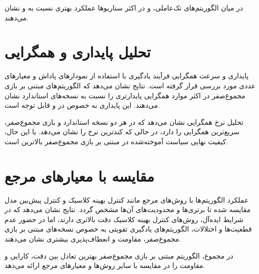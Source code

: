 در میان الگوریتم‌های تک‌عاملی،  و  در اکثر سناریوها عملکرد بهتری نسبت به  و  نشان می‌دهند.

\section{تحلیل پایداری و همگرایی}
\label{sec:stability_analysis}

پایداری و سرعت همگرایی فرآیند یادگیری با استفاده از نمودارهای پاداش و معیارهای عددی مورد بررسی قرار گرفته است. نتایج نشان می‌دهد که الگوریتم‌های مبتنی بر بازی مجموع‌صفر در اکثر موارد همگرایی پایدارتری را نسبت به نسخه‌های استاندارد نشان می‌دهند. این پایداری به خصوص در  و  قابل توجه است.

تحلیل نرخ همگرایی نشان می‌دهد که  در هر دو نسخه استاندارد و بازی مجموع‌صفر، سریع‌ترین همگرایی را دارد، در حالی که  کندترین نرخ را نشان می‌دهد. با این حال، کیفیت نهایی سیاست آموخته‌شده در  مبتنی بر بازی مجموع‌صفر بالاترین است.

\section{مقایسه با معیارهای مرجع}
\label{sec:benchmark_comparison}

عملکرد الگوریتم‌ها با روش‌های مرجع مانند کنترل بهینه کلاسیک و کنترل پیش‌بین مدل مقایسه شده تا برتری‌ها و محدودیت‌های آن‌ها مشخص گردد. نتایج نشان می‌دهد که در شرایط ایده‌آل، روش‌های کنترل بهینه کلاسیک دقت بالاتری دارند، اما در حضور عدم قطعیت‌ها و اختلالات، الگوریتم‌های یادگیری تقویتی به خصوص نسخه‌های مبتنی بر بازی مجموع‌صفر، مقاومت و انعطاف‌پذیری بیشتری نشان می‌دهند.

در مجموع، الگوریتم  مبتنی بر بازی مجموع‌صفر بهترین تعادل بین دقت، کارایی و مقاومت را در مقایسه با سایر روش‌ها و معیارهای مرجع ارائه می‌دهد.










